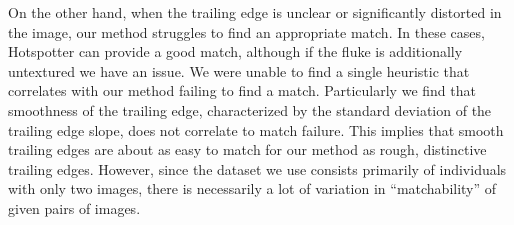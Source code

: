 


On the other hand, when the trailing edge is unclear or significantly distorted in the image, our method struggles to find an appropriate match.
In these cases, Hotspotter can provide a good match, although if the fluke is additionally untextured we have an issue.
We were unable to find a single heuristic that correlates with our method failing to find a match.
Particularly we find that smoothness of the trailing edge, characterized by the standard deviation of the trailing edge slope, does not correlate to match failure.
This implies that smooth trailing edges are about as easy to match for our method as rough, distinctive trailing edges.
However, since the dataset we use consists primarily of individuals with only two images, there is necessarily a lot of variation in ``matchability'' of given pairs of images.


